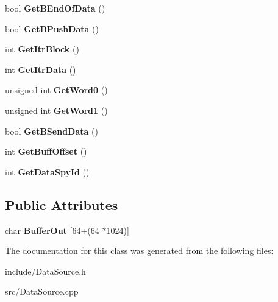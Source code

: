 \begin{DoxyCompactItemize}
\item 
\hypertarget{classDataSource_ae286fec36d342a0ca3477f23a3212639}{bool {\bfseries Get\-B\-End\-Of\-Data} ()}\label{classDataSource_ae286fec36d342a0ca3477f23a3212639}

\item 
\hypertarget{classDataSource_ae6a8df49cd55913c2da4606f327b4cdc}{bool {\bfseries Get\-B\-Push\-Data} ()}\label{classDataSource_ae6a8df49cd55913c2da4606f327b4cdc}

\item 
\hypertarget{classDataSource_aa4b5ba803d0577626173620c77a45b19}{int {\bfseries Get\-Itr\-Block} ()}\label{classDataSource_aa4b5ba803d0577626173620c77a45b19}

\item 
\hypertarget{classDataSource_af5136f57710610bc688a8099d95f2b3b}{int {\bfseries Get\-Itr\-Data} ()}\label{classDataSource_af5136f57710610bc688a8099d95f2b3b}

\item 
\hypertarget{classDataSource_a3b42cea4021a225c5cdbe004bea0cf25}{unsigned int {\bfseries Get\-Word0} ()}\label{classDataSource_a3b42cea4021a225c5cdbe004bea0cf25}

\item 
\hypertarget{classDataSource_a4a95e5206ff0b664e75ace13163a78c7}{unsigned int {\bfseries Get\-Word1} ()}\label{classDataSource_a4a95e5206ff0b664e75ace13163a78c7}

\item 
\hypertarget{classDataSource_ad36090f0568616180070f90680f99af0}{bool {\bfseries Get\-B\-Send\-Data} ()}\label{classDataSource_ad36090f0568616180070f90680f99af0}

\item 
\hypertarget{classDataSource_a48bad490880f40b193fbd81c81c44895}{int {\bfseries Get\-Buff\-Offset} ()}\label{classDataSource_a48bad490880f40b193fbd81c81c44895}

\item 
\hypertarget{classDataSource_a2a6b2dcb7fa1b3d50e20e8c79b1ca192}{int {\bfseries Get\-Data\-Spy\-Id} ()}\label{classDataSource_a2a6b2dcb7fa1b3d50e20e8c79b1ca192}

\end{DoxyCompactItemize}
\subsection*{Public Attributes}
\begin{DoxyCompactItemize}
\item 
\hypertarget{classDataSource_a67f80409701ba5a517dd5a048a53ad41}{char {\bfseries Buffer\-Out} \mbox{[}64+(64 $\ast$1024)\mbox{]}}\label{classDataSource_a67f80409701ba5a517dd5a048a53ad41}

\end{DoxyCompactItemize}


The documentation for this class was generated from the following files\-:\begin{DoxyCompactItemize}
\item 
include/Data\-Source.\-h\item 
src/Data\-Source.\-cpp\end{DoxyCompactItemize}
